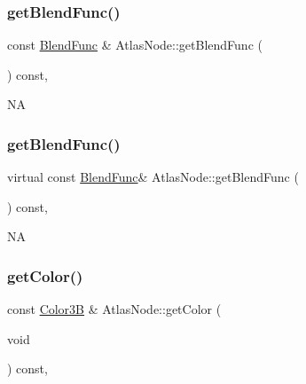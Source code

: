 \subsubsection{\texorpdfstring{get\+Blend\+Func()}{getBlendFunc()}\hspace{0.1cm}{\footnotesize\ttfamily [1/2]}}
{\footnotesize\ttfamily const \hyperlink{structBlendFunc}{Blend\+Func} \& Atlas\+Node\+::get\+Blend\+Func (\begin{DoxyParamCaption}{ }\end{DoxyParamCaption}) const\hspace{0.3cm}{\ttfamily [override]}, {\ttfamily [virtual]}}

NA \mbox{\label{classAtlasNode_a23f13b43d776ea8d280d581847244b1a}} 
\subsubsection{\texorpdfstring{get\+Blend\+Func()}{getBlendFunc()}\hspace{0.1cm}{\footnotesize\ttfamily [2/2]}}
{\footnotesize\ttfamily virtual const \hyperlink{structBlendFunc}{Blend\+Func}\& Atlas\+Node\+::get\+Blend\+Func (\begin{DoxyParamCaption}{ }\end{DoxyParamCaption}) const\hspace{0.3cm}{\ttfamily [override]}, {\ttfamily [virtual]}}

NA \mbox{\label{classAtlasNode_a9d19a5b168ff065c4cb565a94f9f3d7f}} 
\subsubsection{\texorpdfstring{get\+Color()}{getColor()}\hspace{0.1cm}{\footnotesize\ttfamily [1/2]}}
{\footnotesize\ttfamily const \hyperlink{structColor3B}{Color3B} \& Atlas\+Node\+::get\+Color (\begin{DoxyParamCaption}\item[{void}]{ }\end{DoxyParamCaption}) const\hspace{0.3cm}{\ttfamily [override]}, {\ttfamily [virtual]}}

